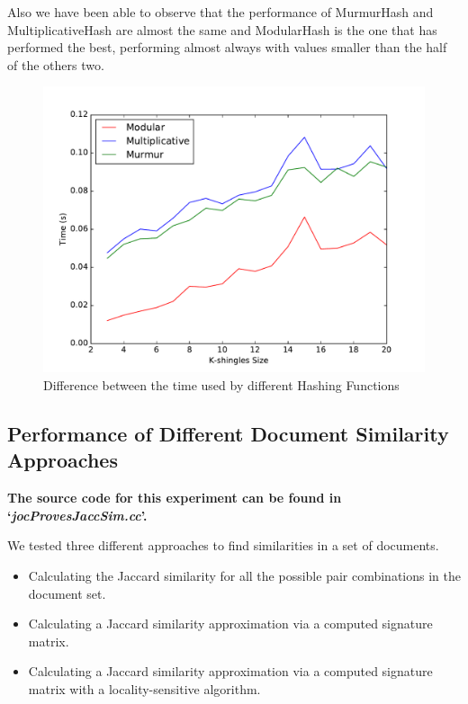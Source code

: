 \documentclass[12pt]{article}
\begin{document}
{Also we have been able to observe that the performance of MurmurHash and MultiplicativeHash are almost the same and ModularHash is the one that has performed the best, performing almost always with values smaller than the half of the others two.



\begin{figure}[H]
	\centering
	\includegraphics[scale=0.55]{graphs/HashFunctionsJaccardAproxTime.pdf} 
	\caption{Difference between the time used by different Hashing Functions}
	\label{fig:HhashFunctionsTime}
\end{figure}


\subsection{Performance of Different Document Similarity Approaches}
\textbf{The source code for this experiment can be found in `\textit{jocProvesJaccSim.cc}'.}
\bigskip

We tested three different approaches to find similarities in a set of documents.
\begin{itemize}
\item Calculating the Jaccard similarity for all the possible pair combinations in the document set.
\item Calculating a Jaccard similarity approximation via a computed signature matrix.
\item Calculating a Jaccard similarity approximation via a computed signature matrix with a locality-sensitive algorithm.
\end{itemize}

}
\end{document}
